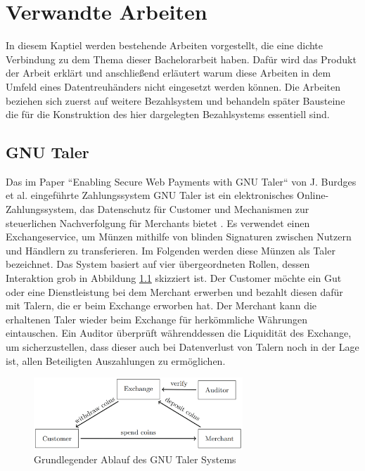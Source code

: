 \documentclass[
	fontsize=12pt,
	headings=small,
	parskip=half,           %
	bibliography=totoc,
	numbers=noenddot,       %
	open=any,               %
]{scrreprt}
\begin{document}
\chapter{Verwandte Arbeiten}
In diesem Kaptiel werden bestehende Arbeiten vorgestellt, die eine dichte Verbindung zu dem Thema dieser Bachelorarbeit haben. Dafür wird das Produkt der Arbeit erklärt und anschließend erläutert warum diese Arbeiten in dem Umfeld eines Datentreuhänders nicht eingesetzt werden können. Die Arbeiten beziehen sich zuerst auf weitere Bezahlsystem und behandeln später Bausteine die für die Konstruktion des hier dargelegten Bezahlsystems essentiell sind.

\section{GNU Taler}
\label{subsec:gnu}
Das im Paper ``Enabling Secure Web Payments with GNU Taler`` von J. Burdges et al. eingeführte Zahlungssystem GNU Taler ist ein elektronisches Online-Zahlungssystem, das Datenschutz für Customer und Mechanismen zur steuerlichen Nachverfolgung für Merchants bietet \cite{gnu-burdges2016enabling}. Es verwendet einen Exchangeservice, um Münzen mithilfe von blinden Signaturen zwischen Nutzern und Händlern zu transferieren. Im Folgenden werden diese Münzen als Taler bezeichnet. Das System basiert auf vier übergeordneten Rollen, dessen Interaktion grob in Abbildung \ref{fig:gnu_taler_overview} skizziert ist. Der Customer möchte ein Gut oder eine Dienstleistung bei dem Merchant erwerben und bezahlt diesen dafür mit Talern, die er beim Exchange erworben hat. Der Merchant kann die erhaltenen Taler wieder beim Exchange für herkömmliche Währungen eintauschen. Ein Auditor überprüft währenddessen die Liquidität des Exchange, um sicherzustellen, dass dieser auch bei Datenverlust von Talern noch in der Lage ist, allen Beteiligten Auszahlungen zu ermöglichen.

\begin{figure}[H]
    \centering
    \includegraphics[width=0.7\textwidth]{gnu_system_graphic.png}
    \caption{Grundlegender Ablauf des GNU Taler Systems \cite{gnu-burdges2016enabling}}
    \label{fig:gnu_taler_overview}
\end{figure}
\end{document}

